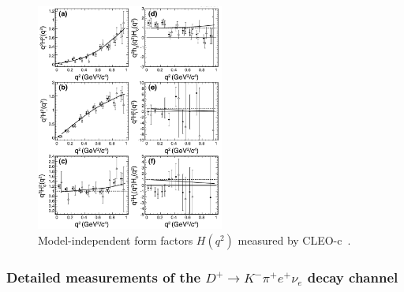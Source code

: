 \begin{figure}[htb]
  \begin{center}
    \vskip0.20in
    \includegraphics[width=0.55\textwidth]{figures/charm/sl_cleoc_H.pdf}
  \end{center}
\vskip-0.20in
  \caption{Model-independent form factors $H(q^2)$ measured by 
    CLEO-c~\cite{Briere:2010zc}.
  \label{fig:cleoc_H}}
\end{figure}

\subsubsection{Detailed measurements of the $D^+ \rightarrow K^- \pi^+ e^+ \nu_e$ 
decay channel}


